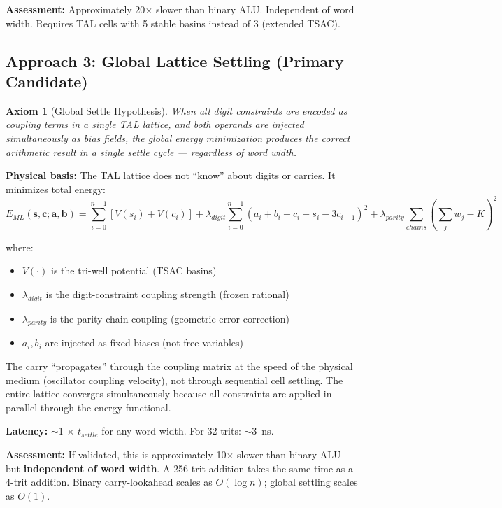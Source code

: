 \documentclass[11pt, a4paper]{report}
\newtheorem{axiom}{Axiom}[chapter]
\begin{document}
\textbf{Assessment:} Approximately 20$\times$ slower than binary ALU.
Independent of word width. Requires TAL cells with 5 stable basins
instead of 3 (extended TSAC).

\subsection{Approach 3: Global Lattice Settling (Primary Candidate)}

\begin{axiom}[Global Settle Hypothesis]
When all digit constraints are encoded as coupling terms in a single TAL
lattice, and both operands are injected simultaneously as bias fields,
the global energy minimization produces the correct arithmetic result in
a single settle cycle --- regardless of word width.
\end{axiom}

\textbf{Physical basis:} The TAL lattice does not ``know'' about digits
or carries. It minimizes total energy:
\begin{equation}
  E_{ML}(\mathbf{s}, \mathbf{c}; \mathbf{a}, \mathbf{b}) =
    \sum_{i=0}^{n-1} \left[ V(s_i) + V(c_i) \right]
    + \lambda_{digit} \sum_{i=0}^{n-1} (a_i + b_i + c_i - s_i - 3c_{i+1})^2
    + \lambda_{parity} \sum_{chains} \left(\sum_j w_j - K\right)^2
\end{equation}

where:
\begin{itemize}[nosep]
  \item $V(\cdot)$ is the tri-well potential (TSAC basins)
  \item $\lambda_{digit}$ is the digit-constraint coupling strength
        (frozen rational)
  \item $\lambda_{parity}$ is the parity-chain coupling (geometric
        error correction)
  \item $a_i, b_i$ are injected as fixed biases (not free variables)
\end{itemize}

The carry ``propagates'' through the coupling matrix at the speed of the
physical medium (oscillator coupling velocity), not through sequential
cell settling. The entire lattice converges simultaneously because all
constraints are applied in parallel through the energy functional.

\textbf{Latency:} $\sim$1 $\times$ $t_{settle}$ for any word width.
For 32 trits: $\sim$3~ns.

\textbf{Assessment:} If validated, this is approximately 10$\times$ slower
than binary ALU --- but \textbf{independent of word width}. A 256-trit
addition takes the same time as a 4-trit addition. Binary carry-lookahead
scales as $O(\log n)$; global settling scales as $O(1)$.
\end{document}
